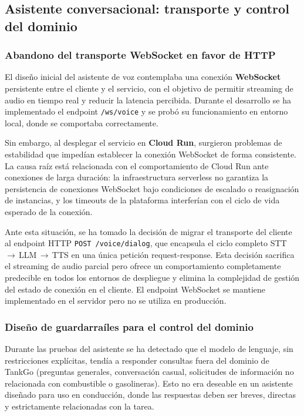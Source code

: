 \subsection{Asistente conversacional: transporte y control del dominio}
\label{subsec:inc_voice}

\subsubsection*{Abandono del transporte WebSocket en favor de HTTP}

El diseño inicial del asistente de voz contemplaba una conexión \textbf{WebSocket}
persistente entre el cliente y el servicio, con el objetivo de permitir streaming de
audio en tiempo real y reducir la latencia percibida. Durante el desarrollo se ha implementado
el endpoint \texttt{/ws/voice} y se probó su funcionamiento en entorno local, donde se
comportaba correctamente.

Sin embargo, al desplegar el servicio en \textbf{Cloud Run}, surgieron problemas de
estabilidad que impedían establecer la conexión WebSocket de forma consistente. La causa
raíz está relacionada con el comportamiento de Cloud Run ante conexiones de larga
duración: la infraestructura serverless no garantiza la persistencia de conexiones
WebSocket bajo condiciones de escalado o reasignación de instancias, y los timeouts de
la plataforma interferían con el ciclo de vida esperado de la conexión.

Ante esta situación, se ha tomado la decisión de migrar el transporte del cliente al endpoint
HTTP \texttt{POST /voice/dialog}, que encapsula el ciclo completo STT\,$\rightarrow$\,LLM\,$\rightarrow$\,TTS
en una única petición request-response. Esta decisión sacrifica el streaming de audio
parcial pero ofrece un comportamiento completamente predecible en todos los entornos de
despliegue y elimina la complejidad de gestión del estado de conexión en el cliente.
El endpoint WebSocket se mantiene implementado en el servidor pero no se utiliza en
producción.

\subsubsection*{Diseño de guardarraíles para el control del dominio}

Durante las pruebas del asistente se ha detectado que el modelo de lenguaje, sin restricciones
explícitas, tendía a responder consultas fuera del dominio de TankGo (preguntas generales,
conversación casual, solicitudes de información no relacionada con combustible o
gasolineras). Esto no era deseable en un asistente diseñado para uso en conducción, donde
las respuestas deben ser breves, directas y estrictamente relacionadas con la tarea.

